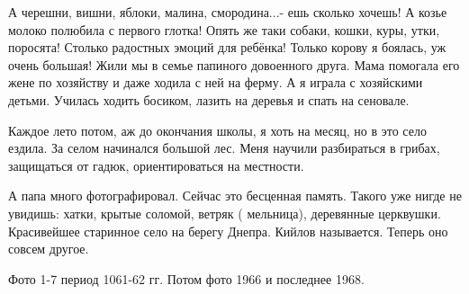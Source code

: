 
А черешни, вишни, яблоки, малина, смородина...- ешь сколько
хочешь! А козье молоко полюбила с первого глотка!  Опять же таки собаки, кошки,
куры, утки, поросята! Столько радостных эмоций для ребёнка!  Только корову я
боялась, уж очень большая! Жили мы в семье папиного довоенного друга. Мама
помогала его жене по хозяйству и даже ходила с ней на ферму. А я играла с
хозяйскими детьми. Училась ходить босиком, лазить на деревья и спать на
сеновале.


Каждое лето потом, аж до окончания школы, я хоть на месяц, но в это село
ездила. За селом начинался большой лес. Меня научили разбираться в грибах,
защищаться от гадюк, ориентироваться на местности.

А папа много фотографировал. Сейчас это бесценная память. Такого уже нигде не
увидишь: хатки, крытые соломой, ветряк ( мельница), деревянные церквушки.
Красивейшее старинное село на берегу Днепра. Кийлов называется. Теперь оно
совсем другое.

Фото 1-7 период 1061-62 гг. Потом фото 1966 и последнее 1968.

